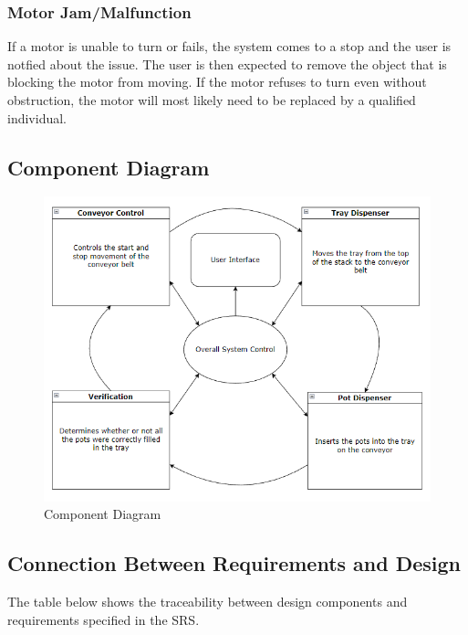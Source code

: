 \documentclass[12pt, titlepage]{article}
\begin{document}
\subsubsection{Motor Jam/Malfunction}
If a motor is unable to turn or fails, the system comes to a stop and the user is notfied about the issue.
The user is then expected to remove the object that is blocking the motor from moving. If the motor refuses to turn even without obstruction,
the motor will most likely need to be replaced by a qualified individual.


\subsection{Component Diagram}
\begin{figure}[H]
  \centering
  \includegraphics[width=\linewidth]{component_diagram.PNG}
  \caption{Component Diagram}
  \label{fig:componentdiagram}
\end{figure}
\subsection{Connection Between Requirements and Design} \label{SecConnection}

  The table below shows the traceability between design components and requirements specified in the SRS.
  
\end{document}
